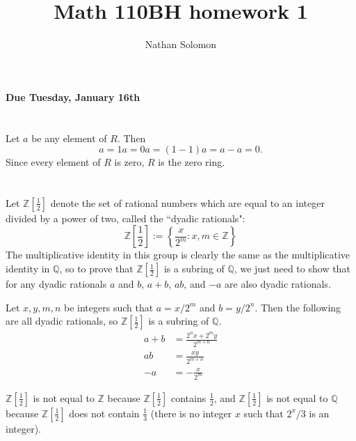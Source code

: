 \documentclass[12pt]{article}
\begin{document}
\title{Math 110BH homework 1}
\author{Nathan Solomon}
\maketitle

\textbf{Due Tuesday, January 16th}

\section{}
\noindent{}\bigskip
\par

Let $a$ be any element of $R$. Then
\[ a=1a=0a=(1-1)a=a-a=0. \]
Since every element of $R$ is zero, $R$ is the zero ring.

\section{}
\noindent{}\bigskip
\par
Let $ \mathbb{Z}[ \frac{1}{2} ]$ denote the set of rational numbers which are equal to an integer divided by a power of two, called the ``dyadic rationals":
\[ \mathbb{Z}[ \frac{1}{2} ] := \left\{ \frac{x}{2^m} : x,m \in \mathbb{Z} \right\} \]
The multiplicative identity in this group is clearly the same as the multiplicative identity in $ \mathbb{Q}$, so to prove that $ \mathbb{Z}[ \frac{1}{2} ]$ is a subring of $ \mathbb{Q}$, we just need to show that for any dyadic rationals $a$ and $b$, $a+b$, $ab$, and $-a$ are also dyadic rationals.
\par
Let $x,y,m,n$ be integers such that $a=x/2^m$ and $b=y/2^n$. Then the following are all dyadic rationals, so $ \mathbb{Z}[ \frac{1}{2} ]$ is a subring of $ \mathbb{Q}$.
\begin{align*}
    a+b &= \frac{2^nx+2^my}{2^{m+n}} \\
    ab &= \frac{xy}{2^{m+n}} \\
    -a &= -\frac{x}{2^m}
\end{align*}
\par
$ \mathbb{Z}[ \frac{1}{2} ]$ is not equal to $ \mathbb{Z}$ because $ \mathbb{Z}[ \frac{1}{2} ]$ contains $ \frac{1}{2} $, and $ \mathbb{Z}[ \frac{1}{2} ]$ is not equal to $ \mathbb{Q}$ because $ \mathbb{Z}[ \frac{1}{2} ]$ does not contain $ \frac{1}{3} $ (there is no integer $x$ such that $2^x/3$ is an integer).
\end{document}
